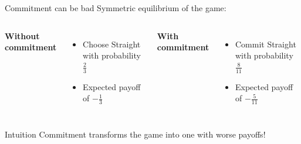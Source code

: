 \documentclass[../slides.tex]{subfiles}
\begin{document}
\begin{frame}{Commitment can be bad}
Symmetric equilibrium of the game:
\vspace{0.8em}

  \begin{columns}[T,onlytextwidth]
    \textbf{Without commitment}
    \begin{itemize}
      \item Choose Straight with probability $\tfrac{2}{3}$
      \item Expected payoff of $-\tfrac{1}{3}$
    \end{itemize}

    \textbf{With commitment}
    \begin{itemize}
      \item Commit Straight with probability $\tfrac{8}{11}$
      \item Expected payoff of $-\tfrac{5}{11}$
    \end{itemize}
  \end{columns}
\end{frame}

\begin{frame}{Intuition}
  \centering
  {\large Commitment transforms the game into one with worse payoffs!}

  \vspace{3em}  %

\end{frame}
\end{document}
